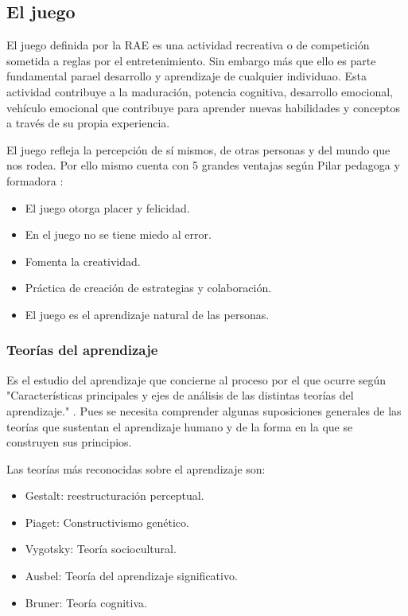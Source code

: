 \subsection{El juego}\label{juego}
El juego definida por la RAE es una actividad  recreativa o de competición sometida a reglas por el entretenimiento. Sin embargo más que ello es parte fundamental parael desarrollo y aprendizaje de cualquier individuao. Esta actividad contribuye a la maduración, potencia cognitiva, desarrollo emocional, vehículo emocional que contribuye para aprender nuevas habilidades y conceptos a través de su propia experiencia.

El juego refleja la percepción de sí mismos, de otras personas y del mundo que nos rodea. Por ello mismo cuenta con 5 grandes ventajas según Pilar pedagoga y formadora \cite{pilarjimenez2015}:
\begin{itemize}
	\item El juego otorga placer y felicidad.
	\item En el juego no se tiene miedo al error.
	\item Fomenta la creatividad.
	\item Práctica de creación de estrategias y colaboración.
	\item El juego es el aprendizaje natural de las personas.
\end{itemize}
	
\subsubsection{Teorías del aprendizaje}
Es el estudio del aprendizaje que concierne al proceso por el que ocurre según "Características principales y ejes de análisis de las distintas teorías del aprendizaje." \cite{orientacionujar2015}. Pues se necesita comprender algunas suposiciones generales de las teorías que sustentan el aprendizaje humano y de la forma en la que se construyen sus principios.

Las teorías más reconocidas sobre el aprendizaje son:
\begin{itemize}
	\item Gestalt: reestructuración perceptual.
	\item Piaget: Constructivismo genético.
	\item Vygotsky: Teoría sociocultural.
	\item Ausbel: Teoría del aprendizaje significativo.
	\item Bruner: Teoría cognitiva.
\end{itemize}

